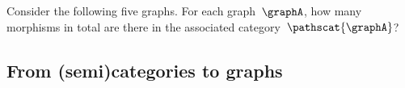 {%
\vfill\pagebreak

\begin{widepar}
    \begin{gradedexercise}
        \label{ex:HowManyMorphisms}
        Consider the following five graphs.
        For each graph~$\graphA$, how many morphisms in total are there in the associated category~$\pathscat{\graphA}$?
    \end{gradedexercise}
\end{widepar}


\subsection[Categories from graphs]{From (semi)categories to graphs}
\label{sec:graphsfromcats}


}
